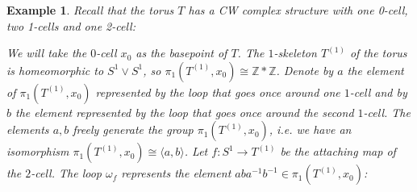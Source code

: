 \documentclass[11pt, letterpaper, oneside]{report}
\theoremstyle{pplain}
\theoremstyle{ddefinition}
\newtheorem{example}[theorem]{Example}
\theoremstyle{nnn}
\theoremstyle{eexercise}
\newcommand{\Z}{{\mathbb Z}}
\begin{document}
\begin{example}
Recall that the torus $T$ has a CW complex structure with one 0-cell, two 1-cells and one 2-cell:
 


We will take the $0$-cell $x_{0}$ as the basepoint of $T$.  
The $1$-skeleton $T^{(1)}$ of the torus is homeomorphic to $S^{1}\vee S^{1}$, so 
$\pi_{1}(T^{(1)}, x_{0})\cong \Z\ast \Z$. Denote by $a$ the element of 
 $\pi_{1}(T^{(1)}, x_{0})$ represented by the loop that goes once around one $1$-cell 
 and by $b$ the element  represented by the loop that goes once around the second $1$-cell. 
The elements $a, b$ freely generate the group $\pi_{1}(T^{(1)}, x_{0})$, i.e.  we have 
an isomorphism $\pi_{1}(T^{(1)}, x_{0}) \cong \langle a, b\rangle$. Let 
 $f\colon S^{1} \to T^{(1)}$ be the attaching map of the $2$-cell.  The loop $\omega_{f}$
 represents the element $aba^{-1}b^{-1} \in \pi_{1}(T^{(1)}, x_{0})$:
 

\end{example}
\end{document}
